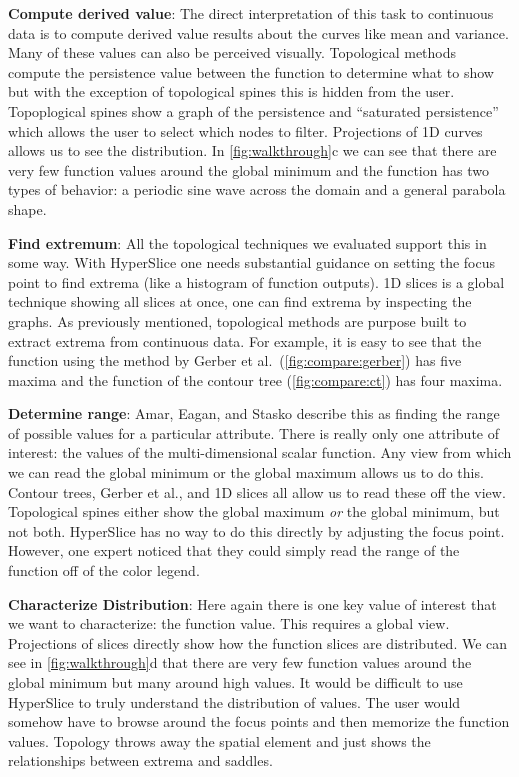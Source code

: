 \textbf{Compute derived value}:\label{compute-derived-value}
The direct interpretation of this task to continuous data is to compute derived
value results about the curves 
like mean and variance. Many of these values can
also be perceived visually.  Topological methods compute the persistence value
between the function to determine what to show but with the exception of
topological spines this is hidden from the user. Topoplogical spines show a
graph of the persistence and ``saturated persistence'' which allows the user
to select which nodes to filter.
Projections of 1D curves allows us to see the distribution.
In
\autoref{fig:walkthrough}c we can see that there are very few function values
around the global minimum and the function has two types of behavior: a
periodic sine wave across the domain and a general parabola shape.

\textbf{Find extremum}:\label{find-extremum}
All the topological techniques we evaluated support this in some
way. With HyperSlice one needs substantial guidance on setting the focus point to find
extrema (like a histogram of function outputs). %
1D slices is a global technique showing all slices at once, one can find
extrema by inspecting the graphs.
As previously mentioned, topological methods are purpose built to extract
extrema from continuous data. For example, it is easy to see that the function
using the method by Gerber et al.\ (\autoref{fig:compare:gerber}) has five
maxima and the function of the contour tree (\autoref{fig:compare:ct}) has four
maxima.

\textbf{Determine range}:\label{determine-range}
Amar, Eagan, and Stasko describe this as finding the range of possible values
for a particular attribute. There is really only one attribute of interest: the
values of the multi-dimensional scalar function. Any view from which we can
read the global minimum or the global maximum allows us to do this. Contour
trees, Gerber et al., and 1D slices all allow us to read these off the view.
Topological spines either show the global maximum \emph{or} the global minimum,
but not both.  HyperSlice has no way to do this directly by adjusting the focus
point.  However, one expert noticed that they could simply read the range of
the function off of the color legend.

\textbf{Characterize Distribution}:
\label{characterize-distribution}
Here again there is one key value of interest that we want to characterize: the
function value.  This requires a global view.  Projections of slices directly
show how the function slices are distributed.  We can see in
\autoref{fig:walkthrough}d that there are very few function values around the
global minimum but many around high values. It would be difficult to use
HyperSlice to truly understand the distribution of values. The user would
somehow have to browse around the focus points and then memorize the function
values. Topology throws away the spatial element and just shows the
relationships between extrema and saddles.

